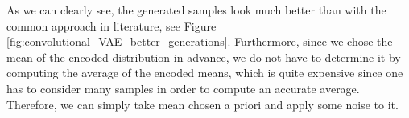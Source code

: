 As we can clearly see, the generated samples look much better than with the common approach in literature, see Figure \ref{fig:convolutional_VAE_better_generations}. Furthermore, since we chose the mean of the encoded distribution in advance, we do not have to determine it by computing the average of the encoded means, which is quite expensive since one has to consider many samples in order to compute an accurate average. Therefore, we can simply take mean chosen a priori and apply some noise to it.
